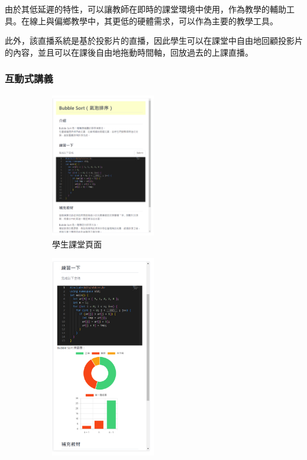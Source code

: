 由於其低延遲的特性，可以讓教師在即時的課堂環境中使用，作為教學的輔助工具。在線上與偏鄉教學中，其更低的硬體需求，可以作為主要的教學工具。

此外，該直播系統是基於投影片的直播，因此學生可以在課堂中自由地回顧投影片的內容，並且可以在課後自由地拖動時間軸，回放過去的上課直播。

\subsubsection{互動式講義}

\begin{figure}[H]
  \begin{subfigure}{0.5\linewidth}
    \centering
    \includegraphics[width=0.5\textwidth]{images/side-s.png}
    \caption{學生課堂頁面}
    \label{fig:student}
  \end{subfigure}
  \begin{subfigure}{0.5\linewidth}
    \centering
    \includegraphics[width=0.5\textwidth]{images/side-t.png}

\end{subfigure}
\end{figure}
